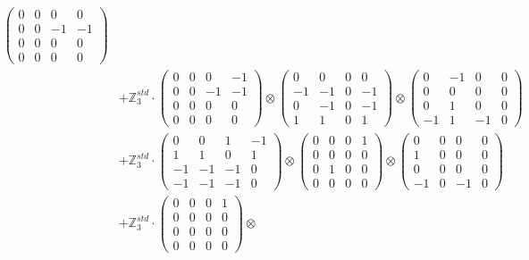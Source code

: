 \documentclass{article}
\begin{document}
{\begin{align}
            \begin{pmatrix} 0 & 0 & 0 & 0 \\ 0 & 0 & -1 & -1 \\ 0 & 0 & 0 & 0 \\ 0 & 0 & 0 & 0 \end{pmatrix} \\ 
        &+ \label{Rs16-Rc11-Solution-13-c25} \mathbb{Z}_3^{std} \cdot 
            \begin{pmatrix} 0 & 0 & 0 & -1 \\ 0 & 0 & -1 & -1 \\ 0 & 0 & 0 & 0 \\ 0 & 0 & 0 & 0 \end{pmatrix} \otimes 
            \begin{pmatrix} 0 & 0 & 0 & 0 \\ -1 & -1 & 0 & -1 \\ 0 & -1 & 0 & -1 \\ 1 & 1 & 0 & 1 \end{pmatrix} \otimes 
            \begin{pmatrix} 0 & -1 & 0 & 0 \\ 0 & 0 & 0 & 0 \\ 0 & 1 & 0 & 0 \\ -1 & 1 & -1 & 0 \end{pmatrix} \\ 
        &+ \label{Rs16-Rc11-Solution-13-c26} \mathbb{Z}_3^{std} \cdot 
            \begin{pmatrix} 0 & 0 & 1 & -1 \\ 1 & 1 & 0 & 1 \\ -1 & -1 & -1 & 0 \\ -1 & -1 & -1 & 0 \end{pmatrix} \otimes 
            \begin{pmatrix} 0 & 0 & 0 & 1 \\ 0 & 0 & 0 & 0 \\ 0 & 1 & 0 & 0 \\ 0 & 0 & 0 & 0 \end{pmatrix} \otimes 
            \begin{pmatrix} 0 & 0 & 0 & 0 \\ 1 & 0 & 0 & 0 \\ 0 & 0 & 0 & 0 \\ -1 & 0 & -1 & 0 \end{pmatrix} \\ 
        &+ \label{Rs16-Rc11-Solution-13-c27} \mathbb{Z}_3^{std} \cdot 
            \begin{pmatrix} 0 & 0 & 0 & 1 \\ 0 & 0 & 0 & 0 \\ 0 & 0 & 0 & 0 \\ 0 & 0 & 0 & 0 \end{pmatrix} \otimes 

\end{align}}
\end{document}
